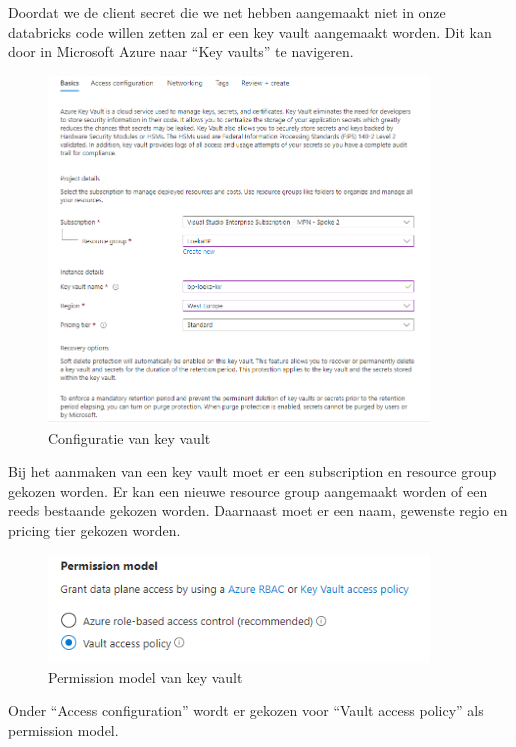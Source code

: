 Doordat we de client secret die we net hebben aangemaakt niet in onze databricks code willen zetten zal er een key vault aangemaakt worden. Dit kan door in Microsoft Azure naar ``Key vaults'' te navigeren.

\begin{figure}[H]
    \centering
    \includegraphics[width=0.9\textwidth]{./graphics/databricks/connection_8.png}
    \caption{Configuratie van key vault}
\end{figure}

Bij het aanmaken van een key vault moet er een subscription en resource group gekozen worden. Er kan een nieuwe resource group aangemaakt worden of een reeds bestaande gekozen worden. Daarnaast moet er een naam, gewenste regio en pricing tier gekozen worden.

\begin{figure}[H]
    \centering
    \includegraphics[width=0.9\textwidth]{./graphics/databricks/connection_9.png}
    \caption{Permission model van key vault}
\end{figure}

Onder ``Access configuration'' wordt er gekozen voor ``Vault access policy'' als permission model.

